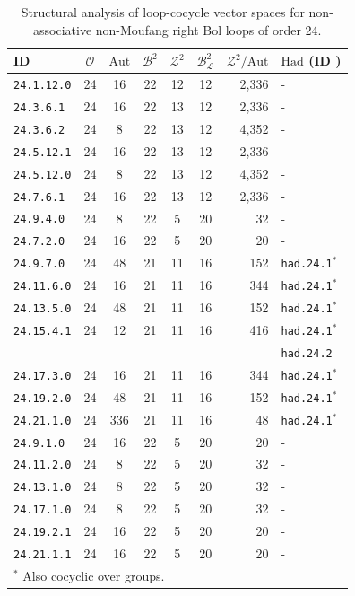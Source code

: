 \documentclass[11pt,a4paper]{article}
\begin{document}
\begin{table}[ht]
\centering
\caption{Structural analysis of loop-cocycle vector spaces for non-associative non-Moufang right Bol loops of order 24.}
\label{tab:spaces_3}
\begin{tabular}{@{}lcccccrl}
\toprule
\textbf{ID \citep{Moorhouse}} &  \textbf{$\mathcal{O}$} & \textbf{$\mathrm{Aut}$} & \textbf{$\mathcal{B}^2$} & \textbf{$\mathcal{Z}^2$}  & \textbf{$\mathcal{B}^2_\mathcal{L}$} &  \textbf{$\mathcal{Z}^2/\mathrm{Aut}$} & \textbf{$\mathrm{Had}$} (\textbf{ID \citep{Sloane}}) \\ \midrule
\texttt{24.1.12.0} & 24 & 16 & 22 & 12 & 12 & 2,336 & -\\
\texttt{24.3.6.1} & 24 & 16 & 22 & 13  & 12 & 2,336 & -\\
\texttt{24.3.6.2} & 24 & 8 & 22 & 13 & 12 & 4,352 & -\\
\texttt{24.5.12.1} & 24 & 16 & 22 & 13  & 12 & 2,336& -\\
\texttt{24.5.12.0} & 24 & 8 & 22 & 13 & 12 & 4,352 & -\\
\texttt{24.7.6.1} & 24 & 16 & 22 & 13 & 12 & 2,336 & -\\
\texttt{24.9.4.0} & 24 & 8 & 22 & 5 & 20 & 32 & -\\
\texttt{24.7.2.0} & 24 & 16 & 22 & 5 & 20 & 20 & -\\
\texttt{24.9.7.0} & 24 & 48 & 21 & 11 & 16 & 152 & \texttt{had.24.1}$^*$\\
\texttt{24.11.6.0} & 24 & 16 & 21 & 11 & 16 & 344 & \texttt{had.24.1}$^*$\\
\texttt{24.13.5.0} & 24 & 48 & 21 & 11 & 16 & 152 & \texttt{had.24.1}$^*$\\
\texttt{24.15.4.1} & 24 & 12 & 21 & 11 & 16 & 416 & \texttt{had.24.1}$^*$\\
 &  &  &   &  &  & & \texttt{had.24.2}\\
\texttt{24.17.3.0} & 24 & 16 & 21 & 11 & 16 & 344 & \texttt{had.24.1}$^*$\\
\texttt{24.19.2.0} & 24 & 48 & 21 & 11 & 16 & 152 & \texttt{had.24.1}$^*$\\
\texttt{24.21.1.0} & 24 & 336 & 21 & 11 & 16 & 48 & \texttt{had.24.1}$^*$\\
\texttt{24.9.1.0} & 24 & 16 & 22 & 5 & 20 & 20 & -\\
\texttt{24.11.2.0} & 24 & 8 & 22 & 5 & 20  & 32 & -\\
\texttt{24.13.1.0} & 24 & 8 & 22 & 5 & 20 & 32 & -\\
\texttt{24.17.1.0} & 24 & 8 & 22 & 5 & 20 & 32 & -\\
\texttt{24.19.2.1} & 24 & 16 & 22 & 5 & 20 & 20 & -\\
\texttt{24.21.1.1} & 24 & 16 & 22 & 5 & 20 & 20 & -\\ \bottomrule
\multicolumn{8}{l}{\footnotesize $^*$ Also cocyclic over groups.}
\end{tabular}
\end{table}
\end{document}

